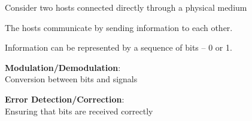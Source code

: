 \begin{frame}[plain]\begin{center}
\end{center}\end{frame}

\begin{frame}[t]\normalsize
	Consider two hosts connected directly through a physical medium
\end{frame}

\begin{frame}[t]\normalsize
	The hosts communicate by sending information to each other.
\end{frame}

\begin{frame}[t]\normalsize
	Information can be represented by a sequence of bits -- 0 or 1.
\end{frame}

\begin{frame} \begin{center} \large
	\textbf{Modulation/Demodulation}:\\ Conversion between bits and signals\\
\end{center} \end{frame}

\begin{frame} \begin{center} \large
	\textbf{Error Detection/Correction}:\\ Ensuring that bits are received correctly\\
\end{center} \end{frame}

